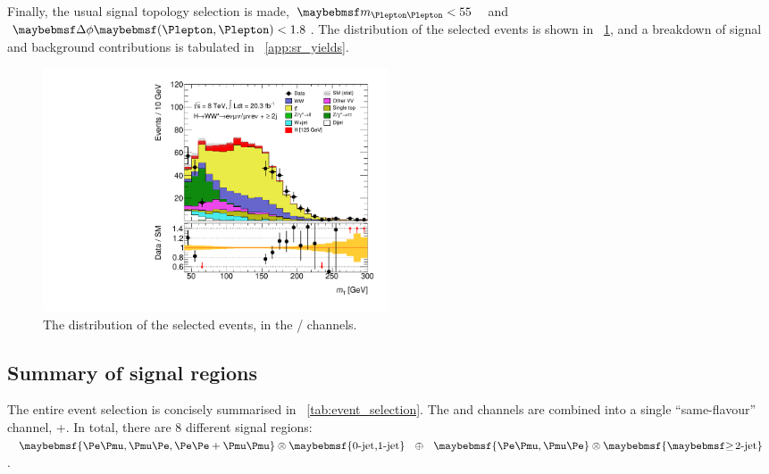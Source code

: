 Finally, the usual signal topology selection is made, \unit{$\mll < 55$}{\GeV} and 
$\dphill < 1.8$. 
The \mt distribution of the selected \twojet events is shown in \Figure~\ref{fig:sel:2j:mt}, 
and a breakdown of signal and background contributions is tabulated in 
\Appendix~\ref{app:sr_yields}.

\begin{figure}[t]
	\includegraphics[width=0.495\textwidth]{tex/selection/emme_CutFailVBFTopoDPhillggFlike_2jetincl_MT_TrackHWW_Clj_mh125_lin}
	\caption{The \mt distribution of the selected \twojet events, in the \emch/\mech 
	channels.}
	\label{fig:sel:2j:mt}
\end{figure}



\subsection{Summary of signal regions}
\label{sec:selection:summary}

The entire event selection is concisely summarised in \Table~\ref{tab:event_selection}. The 
\eech and \mmch channels are combined into a single ``same-flavour'' channel, \eech{}+\mmch.
In total, there are 8 different signal regions: $\braces{\emch,\mech,\eech{}+\mmch} 
\otimes \braces{\text{0-jet,1-jet}}~~\oplus~~\braces{\emch,\mech} \otimes \braces{\twojet}$. 

